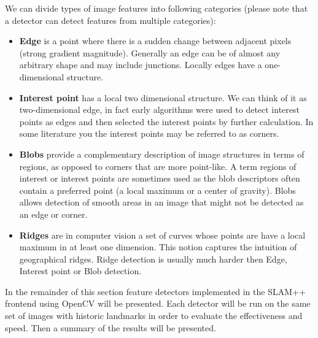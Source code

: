 We can divide types of image features into following categories (please note that a detector can detect features from multiple categories):
\begin{itemize}
	\item \textbf{Edge} is a point where there is a sudden change between adjacent pixels (strong gradient magnitude). Generally an edge can be of almost any arbitrary shape and may include junctions. Locally edges have a one-dimensional structure.
	\item \textbf{Interest point} has a local two dimensional structure. We can think of it as two-dimensional edge, in fact early algorithms were used to detect interest points as edges and then selected the interest points by further calculation. In some literature you the interest points may be referred to as corners.
	\item \textbf{Blobs} provide a complementary description of image structures in terms of regions, as opposed to corners that are more point-like. A term regions of interest or interest points are sometimes used as the blob descriptors often contain a preferred point (a local maximum or a center of gravity). Blobs allows detection of smooth areas in an image that might not be detected as an edge or corner.
	\item \textbf{Ridges} are in computer vision a set of curves whose points are have a local maximum in at least one dimension. This notion captures the intuition of geographical ridges. Ridge detection is usually much harder then Edge, Interest point or Blob detection.
\end{itemize}

In the remainder of this section feature detectors implemented in the SLAM++ frontend using OpenCV will be presented. Each detector will be run on the same set of images with historic landmarks in order to evaluate the effectiveness and speed. Then a summary of the results will be presented.
 
